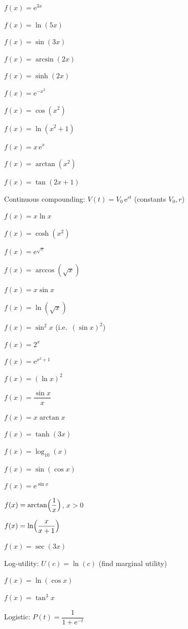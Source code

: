 \begin{problems}
  \item $f(x)=\mathrm{e}^{3x}$
  \item $f(x)=\ln(5x)$
  \item $f(x)=\sin(3x)$
  \item $f(x)=\arcsin(2x)$
  \item $f(x)=\sinh(2x)$
  \item $f(x)=\mathrm{e}^{-x^{2}}$
  \item $f(x)=\cos(x^{2})$
  \item $f(x)=\ln(x^{2}+1)$
  \item $f(x)=x\,\mathrm{e}^{x}$
  \item $f(x)=\arctan(x^{2})$
  \item $f(x)=\tan(2x+1)$
  \item Continuous compounding: $V(t)=V_{0}\,\mathrm{e}^{rt}$ \quad
        (constants $V_{0},r$)
  \item $f(x)=x\ln x$
  \item $f(x)=\cosh(x^{2})$
  \item $f(x)=\mathrm{e}^{\sqrt{x}}$
  \item $f(x)=\arccos(\sqrt{x})$
  \item $f(x)=x\sin x$
  \item $f(x)=\ln(\sqrt{x})$
  \item $f(x)=\sin^{2}x$ \quad (i.e.\ $(\sin x)^{2}$)
  \item $f(x)=2^{x}$
  \item $f(x)=\mathrm{e}^{x^{2}+1}$
  \item $f(x)=(\ln x)^{2}$
  \item $f(x)=\dfrac{\sin x}{x}$
  \item $f(x)=x\arctan x$
  \item $f(x)=\tanh(3x)$
  \item $f(x)=\log_{10}(x)$
  \item $f(x)=\sin(\cos x)$
  \item $f(x)=\mathrm{e}^{\sin x}$
  \item $f(x)=\arctan\Bigl(\dfrac{1}{x}\Bigr)$, \quad $x>0$
  \item $f(x)=\ln\Bigl(\dfrac{x}{x+1}\Bigr)$
  \item $f(x)=\sec(3x)$
  \item Log-utility: $U(c)=\ln(c)$ \quad (find marginal utility)
  \item $f(x)=\ln(\cos x)$
  \item $f(x)=\tan^{3}x$
  \item Logistic: $P(t)=\dfrac{1}{1+\mathrm{e}^{-t}}$

\end{problems}
